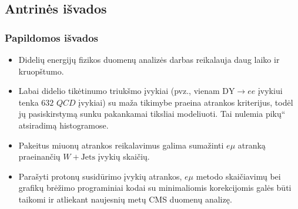 \documentclass[xcolor=dvipsnames]{beamer}
\newcommand{\ltq}[1]{{\quotedblbase{}#1\textquotedblleft{}}}
\newcommand{\WJets}{\mathit{W}+\mathrm{Jets}}
\newcommand{\emu}{\mathit{e}\mu}
\newcommand{\DYee}{\mathrm{DY} \! \rightarrow \! \mathit{ee}}
\newcommand{\QCD}{\mathit{QCD}}
\begin{document}
\begin{frame}
\subsection{Antrinės išvados}
\frametitle{Papildomos išvados}
\begin{itemize}
\item Didelių energijų fizikos duomenų analizės darbas reikalauja daug laiko ir kruopštumo.
\item Labai didelio tikėtinumo triukšmo įvykiai (pvz., vienam $\DYee$ įvykiui tenka $632$ $\QCD$ įvykiai) su maža tikimybe praeina atrankos kriterijus, todėl jų pasiskirstymą sunku pakankamai tiksliai modeliuoti. Tai nulemia \ltq{pikų} atsiradimą histogramose.
\item Pakeitus miuonų atrankos reikalavimus galima sumažinti $\emu$ atranką praeinančių $\WJets$ įvykių skaičių.
\item Parašyti protonų susidūrimo įvykių atrankos, $\emu$ metodo skaičiavimų bei grafikų brėžimo programiniai kodai su minimaliomis korekcijomis galės būti taikomi ir atliekant naujesnių metų CMS duomenų analizę.
\end{itemize}
\end{frame}
\end{document}
